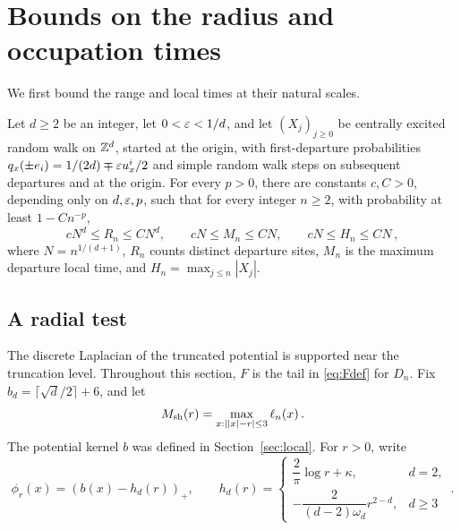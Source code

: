 \section{Bounds on the radius and occupation times}\label{sec:coarse}
We first bound the range and local times at their natural scales.

\begin{proposition}\label{prop:coarse}
Let $d\geq2$ be an integer, let $0<\varepsilon<1/d$, and let $(X_j)_{j\geq0}$ be centrally
excited random walk on $\mathbb Z^d$, started at the origin, with first-departure probabilities
$q_x(\pm e_i)=1/(2d)\mp\varepsilon u_x^i/2$ and simple random walk steps
on subsequent departures and at the origin. For every $p>0$, there are constants
$c,C>0$, depending only on $d,\varepsilon,p$, such that for every integer
$n\geq2$, with probability at least $1-Cn^{-p}$,
\begin{equation}\label{eq:coarse}
cN^d\leq R_n\leq CN^d ,\qquad
cN\leq M_n\leq CN ,\qquad cN\leq H_n\leq CN\, ,
\end{equation}
where $N=n^{1/(d+1)}$, $R_n$ counts distinct departure sites,
$M_n$ is the maximum departure local time, and
$H_n=\max_{j\leq n}|X_j|$.
\end{proposition}

\subsection{A radial test}
The discrete Laplacian of the truncated potential is supported near
the truncation level.
Throughout this section, $F$ is the tail in \eqref{eq:Fdef} for $D_n$.
Fix $b_d=\lceil\sqrt d/2\rceil+6$, and let
\begin{equation}\label{eq:shell-def}
M_{\rm sh}(r)=\max_{x:||x|-r|\leq3}\ell_n(x)\, .
\end{equation}
The potential kernel $b$ was defined in Section~\ref{sec:local}.
For $r>0$, write
\begin{equation}\label{eq:radial-test}
\phi_r(x)=(b(x)-h_d(r))_+ ,\qquad
h_d(r)=\begin{cases}
\dfrac2\pi\log r+\kappa,&d=2,\\[3pt]
-\dfrac2{(d-2)\omega_d}r^{2-d},&d\geq3
\end{cases}\, .
\end{equation}

